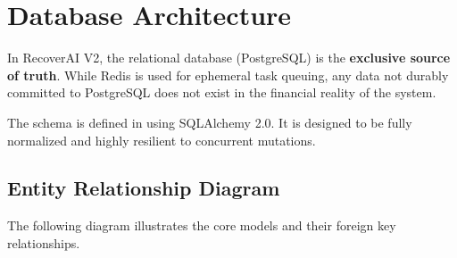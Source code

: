 
\section{Database Architecture}

\begin{tcolorbox}[summarybox={\iconDatabase[1.5] The Indisputable Source of Truth}]
\color{textdark}
In RecoverAI V2, the relational database (PostgreSQL) is the \textbf{exclusive source of truth}. While Redis is used for ephemeral task queuing, any data not durably committed to PostgreSQL does not exist in the financial reality of the system.

The schema is defined in  using SQLAlchemy 2.0. It is designed to be fully normalized and highly resilient to concurrent mutations.
\end{tcolorbox}

\vspace{0.8cm}

\subsection{Entity Relationship Diagram}

The following diagram illustrates the core models and their foreign key relationships.

\vspace{0.5cm}

